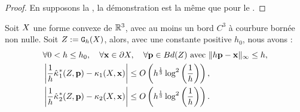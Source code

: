 \begin{proof}
  En supposons la , la démonstration est la
  même que pour le .
\end{proof}
%
\begin{observation}
  \label{obs:curvature-estimator-3d-k1k2-pf-conv}
  Soit $X$ une forme convexe de $\mathbb{R}^3$, avec au moins un bord $C^3$ à
  courbure bornée non nulle. Soit $Z := \mathtt{G}_{h}(X)$, alors, avec une
  constante positive $h_0$, nous avons :
  \begin{align}
    &\forall 0 < h \le h_0, \quad \forall \mathbf{x} \in \partial X, \quad \forall \mathbf{p} \in Bd({Z}) \text{~avec~} \| h\mathbf{p} -\mathbf{x}\|_\infty \le h, \nonumber\\
    &\left | \frac{1}{h}\hat{\kappa_{}}_{1}^{*}(Z,\mathbf{p}) - \kappa_{1}(X,\mathbf{x}) \right| \le O\left( h^{\frac{1}{3}} \log^2 \left(\frac{1}{h}\right)\right) ,\\
    &\left | \frac{1}{h}\hat{\kappa_{}}_{2}^{*}(Z,\mathbf{p}) - \kappa_{2}(X,\mathbf{x}) \right| \le O\left( h^{\frac{1}{3}} \log^2 \left(\frac{1}{h}\right)\right) .
  \end{align}
\end{observation}
